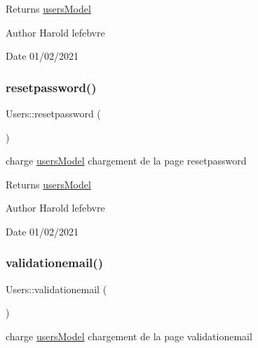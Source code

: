\begin{DoxyReturn}{Returns}
\mbox{\hyperlink{classusers_model}{users\+Model}} 
\end{DoxyReturn}
\begin{DoxyAuthor}{Author}
Harold lefebvre 
\end{DoxyAuthor}
\begin{DoxyDate}{Date}
01/02/2021 
\end{DoxyDate}
\mbox{\label{class_users_acec8594ced3179c05cede5dc3dd29aa6}} 
\subsubsection{\texorpdfstring{resetpassword()}{resetpassword()}}
{\footnotesize\ttfamily Users\+::resetpassword (\begin{DoxyParamCaption}{ }\end{DoxyParamCaption})}



charge \mbox{\hyperlink{classusers_model}{users\+Model}} chargement de la page resetpassword 

\begin{DoxyReturn}{Returns}
\mbox{\hyperlink{classusers_model}{users\+Model}} 
\end{DoxyReturn}
\begin{DoxyAuthor}{Author}
Harold lefebvre 
\end{DoxyAuthor}
\begin{DoxyDate}{Date}
01/02/2021 
\end{DoxyDate}
\mbox{\label{class_users_a0d97ed6a9ac4b398fa183bdcd9fb819c}} 
\subsubsection{\texorpdfstring{validationemail()}{validationemail()}}
{\footnotesize\ttfamily Users\+::validationemail (\begin{DoxyParamCaption}{ }\end{DoxyParamCaption})}



charge \mbox{\hyperlink{classusers_model}{users\+Model}} chargement de la page validationemail 

